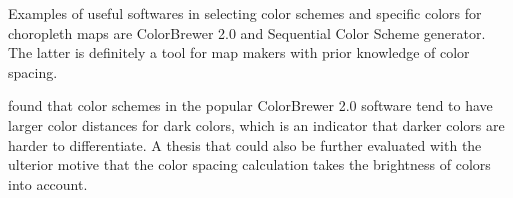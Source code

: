 Examples of useful softwares in selecting color schemes and specific colors for choropleth maps are ColorBrewer 2.0 and Sequential Color Scheme generator. The latter is definitely a tool for map makers with prior knowledge of color spacing. 

\textcite{brychtovaC2017} found that color schemes in the popular ColorBrewer 2.0 software tend to have larger color distances for dark colors, which is an indicator that darker colors are harder to differentiate. A thesis that could also be further evaluated with the ulterior motive that the color spacing calculation takes the brightness of colors into account.



%